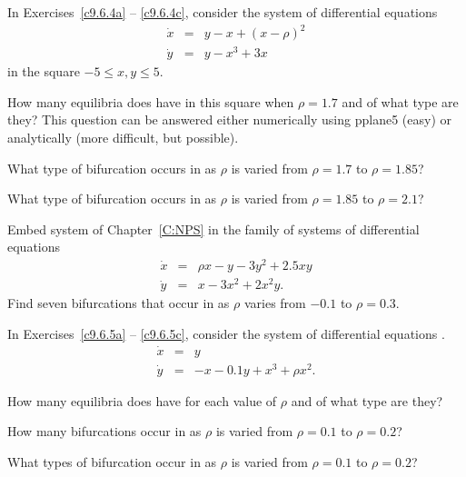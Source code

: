 \documentclass{ximera}
\begin{document}
\noindent In Exercises~\ref{c9.6.4a} -- \ref{c9.6.4c}, consider the system 
of differential equations 
\begin{equation*}  \label{E:twoeq}
\begin{array}{rcl}
\dot{x} & = & y - x + (x-\rho)^2 \\
\dot{y} & = & y - x^3 +3x
\end{array}
\end{equation*}
in the square $-5 \leq x,y \leq 5$.
\begin{exercise} \label{c9.6.4a}
How many equilibria does  have in this square when 
$\rho=1.7$ and of what type are they?  This question can be answered either 
numerically using {\sf pplane5} (easy) or analytically (more difficult, but 
possible).
\end{exercise}
\begin{exercise} \label{c9.6.4b}
What type of bifurcation occurs in  as $\rho$ is varied
from $\rho=1.7$ to $\rho=1.85$?
\end{exercise}
\begin{exercise} \label{c9.6.4c}
What type of bifurcation occurs in  as $\rho$ is varied
from $\rho=1.85$ to $\rho=2.1$?
\end{exercise}

\begin{exercise} \label{c9.6.6}
Embed system  of Chapter~\ref{C:NPS} in the family of systems of 
differential equations 
\begin{equation} \label{E:eqn2}
\begin{array}{rcl}
\dot{x} & = & \rho x-y-3y^2+2.5xy\\
\dot{y} & = & x-3x^2+2x^2y.
\end{array}
\end{equation}
Find seven bifurcations that occur in  as $\rho$ varies from 
$-0.1$ to $\rho=0.3$. 
\end{exercise}

\noindent In Exercises~\ref{c9.6.5a} -- \ref{c9.6.5c}, consider the system 
of differential equations .
\begin{equation*}  \label{E:saddleconn}
\begin{array}{rcl}
\dot{x} & = & y  \\
\dot{y} & = & -x - 0.1y + x^3 + \rho x^2.
\end{array}
\end{equation*}
\begin{exercise} \label{c9.6.5a}
How many equilibria does  have for each value of 
$\rho$ and of what type are they?  
\end{exercise}
\begin{exercise} \label{c9.6.5b}
How many bifurcations occur in  as $\rho$ is 
varied from $\rho=0.1$ to $\rho=0.2$?
\end{exercise}
\begin{exercise} \label{c9.6.5c}
What types of bifurcation occur in  as $\rho$ is 
varied from $\rho=0.1$ to $\rho=0.2$?
\end{exercise}
\end{document}
